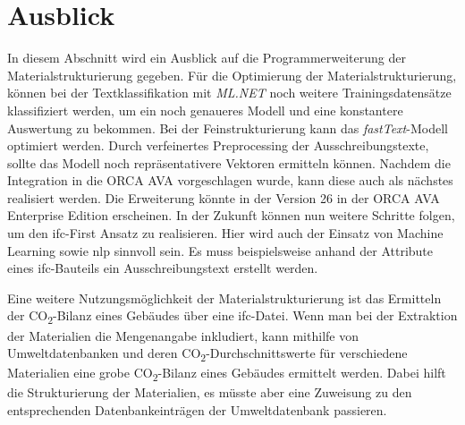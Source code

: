 \section{Ausblick}
\label{c:closing:outlook}
In diesem Abschnitt wird ein Ausblick auf die Programmerweiterung der Materialstrukturierung gegeben. Für die Optimierung der Materialstrukturierung, können bei der Textklassifikation mit \textit{ML.NET} noch weitere Trainingsdatensätze klassifiziert werden, um ein noch genaueres Modell und eine konstantere Auswertung zu bekommen. Bei der Feinstrukturierung kann das \textit{fastText}-Modell optimiert werden. Durch verfeinertes Preprocessing der Ausschreibungstexte, sollte das Modell noch repräsentativere Vektoren ermitteln können. Nachdem die Integration in die ORCA AVA vorgeschlagen wurde, kann diese auch als nächstes realisiert werden. Die Erweiterung könnte in der Version 26 in der ORCA AVA Enterprise Edition erscheinen. In der Zukunft können nun weitere Schritte folgen, um den \ac{ifc}-First Ansatz zu realisieren. Hier wird auch der Einsatz von Machine Learning sowie \ac{nlp} sinnvoll sein. Es muss beispielsweise anhand der Attribute eines \ac{ifc}-Bauteils ein Ausschreibungstext erstellt werden.

Eine weitere Nutzungsmöglichkeit der Materialstrukturierung ist das Ermitteln der CO\textsubscript{2}-Bilanz eines Gebäudes über eine \ac{ifc}-Datei. Wenn man bei der Extraktion der Materialien die Mengenangabe inkludiert, kann mithilfe von Umweltdatenbanken und deren CO\textsubscript{2}-Durchschnittswerte für verschiedene Materialien eine grobe CO\textsubscript{2}-Bilanz eines Gebäudes ermittelt werden. Dabei hilft die Strukturierung der Materialien, es müsste aber eine Zuweisung zu den entsprechenden Datenbankeinträgen der Umweltdatenbank passieren. 
